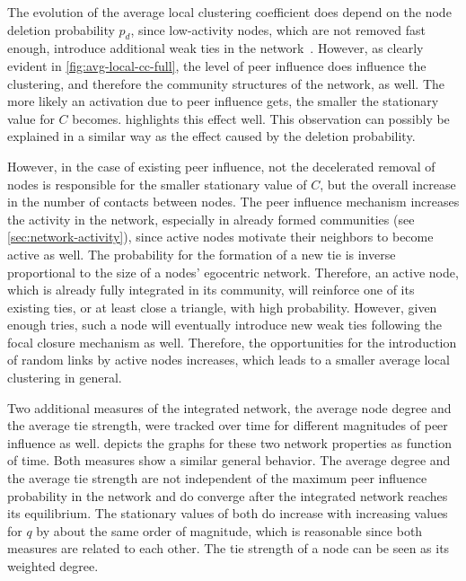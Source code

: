 The evolution of the average local clustering coefficient does depend on the node deletion probability \( p_{d} \), since low-activity nodes, which are not removed fast enough, introduce additional weak ties in the network~\cite{Laurent2015}.
However, as clearly evident in \cref{fig:avg-local-cc-full}, the level of peer influence does influence the clustering, and therefore the community structures of the network, as well.
The more likely an activation due to peer influence gets, the smaller the stationary value for \( C \) becomes.
 highlights this effect well.
This observation can possibly be explained in a similar way as the effect caused by the deletion probability.

However, in the case of existing peer influence, not the decelerated removal of nodes is responsible for the smaller stationary value of \( C \), but the overall increase in the number of contacts between nodes.
The peer influence mechanism increases the activity in the network, especially in already formed communities (see \cref{sec:network-activity}), since active nodes motivate their neighbors to become active as well.
The probability for the formation of a new tie is inverse proportional to the size of a nodes' egocentric network.
Therefore, an active node, which is already fully integrated in its community, will reinforce one of its existing ties, or at least close a triangle, with high probability.
However, given enough tries, such a node will eventually introduce new weak ties following the focal closure mechanism as well.
Therefore, the opportunities for the introduction of random links by active nodes increases, which leads to a smaller average local clustering in general.

Two additional measures of the integrated network, the average node degree and the average tie strength, were tracked over time for different magnitudes of peer influence as well.
 depicts the graphs for these two network properties as function of time.
Both measures show a similar general behavior.
The average degree and the average tie strength are not independent of the maximum peer influence probability in the network and do converge after the integrated network reaches its equilibrium.
The stationary values of both do increase with increasing values for \( q \) by about the same order of magnitude, which is reasonable since both measures are related to each other.
The tie strength of a node can be seen as its weighted degree.

